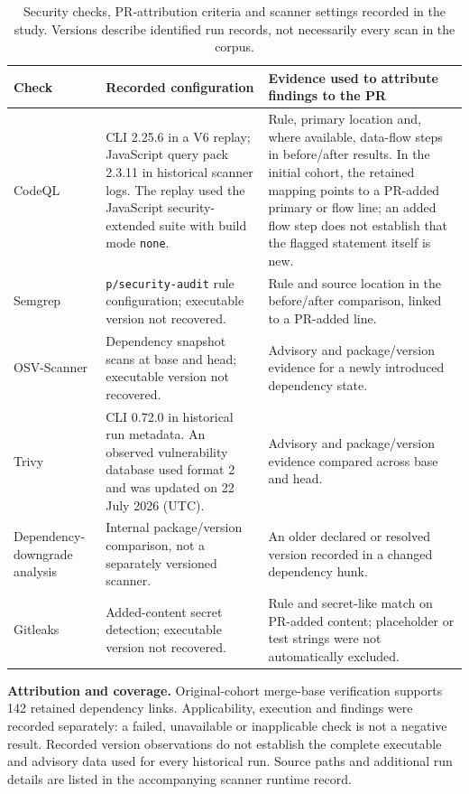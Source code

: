 \begin{table}[H]
\caption{Security checks, PR-attribution criteria and scanner settings recorded in the study. Versions describe identified run records, not necessarily every scan in the corpus.}
\label{tab:scanners}
\footnotesize\renewcommand{\arraystretch}{1.15}
\begin{tabularx}{\linewidth}{@{}L{1.65cm}L{3.05cm}Y@{}}
\toprule
\textbf{Check} & \textbf{Recorded configuration} & \textbf{Evidence used to attribute findings to the PR}\\
\midrule
CodeQL & CLI 2.25.6 in a V6 replay; JavaScript query pack 2.3.11 in historical scanner logs. The replay used the JavaScript security-extended suite with build mode \texttt{none}. & Rule, primary location and, where available, data-flow steps in before/after results. In the initial cohort, the retained mapping points to a PR-added primary or flow line; an added flow step does not establish that the flagged statement itself is new.\\
Semgrep & \texttt{p/security-audit} rule configuration; executable version not recovered. & Rule and source location in the before/after comparison, linked to a PR-added line.\\
OSV-Scanner & Dependency snapshot scans at base and head; executable version not recovered. & Advisory and package/version evidence for a newly introduced dependency state.\\
Trivy & CLI 0.72.0 in historical run metadata. An observed vulnerability database used format 2 and was updated on 22 July 2026 (UTC). & Advisory and package/version evidence compared across base and head.\\
Dependency-downgrade analysis & Internal package/version comparison, not a separately versioned scanner. & An older declared or resolved version recorded in a changed dependency hunk.\\
Gitleaks & Added-content secret detection; executable version not recovered. & Rule and secret-like match on PR-added content; placeholder or test strings were not automatically excluded.\\
\bottomrule
\end{tabularx}
\par\smallskip\raggedright\scriptsize
\textbf{Attribution and coverage.} Original-cohort merge-base verification supports 142 retained dependency links. Applicability, execution and findings were recorded separately: a failed, unavailable or inapplicable check is not a negative result. Recorded version observations do not establish the complete executable and advisory data used for every historical run. Source paths and additional run details are listed in the accompanying scanner runtime record.
\end{table}

